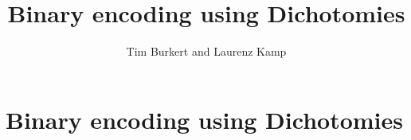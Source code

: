 \documentclass[parskip,11pt,nochapterpage,bigchapter,linedtoc,colorback,accentcolor=tud1d,openany]{tudreport}
\title{Binary encoding using Dichotomies}
\subtitle{Tim Burkert and Laurenz Kamp}
\begin{document}
\maketitle
\tableofcontents

\chapter{Binary encoding using Dichotomies}




\end{document}
